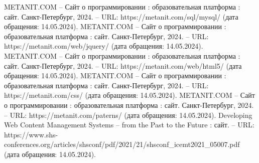 \begin{thebibliography}{20}
		METANIT.COM – Сайт о программировании : образовательная платформа : сайт. Санкт-Петербург, 2024. – URL: https://metanit.com/sql/mysql/ (дата обращения: 14.05.2024).
		METANIT.COM – Сайт о программировании : образовательная платформа : сайт. Санкт-Петербург, 2024. – URL: https://metanit.com/web/jquery/ (дата обращения: 14.05.2024).
	 METANIT.COM – Сайт о программировании : образовательная платформа : сайт. Санкт-Петербург, 2024. – URL: https://metanit.com/web/html5/ (дата обращения: 14.05.2024).
	 METANIT.COM – Сайт о программировании : образовательная платформа : сайт. Санкт-Петербург, 2024. – URL: https://metanit.com/css/ (дата обращения: 14.05.2024).
	 METANIT.COM – Сайт о программировании : образовательная платформа : сайт. Санкт-Петербург, 2024. – URL: https://metanit.com/paterns/ (дата обращения: 14.05.2024).	
	 Developing Web Content Management Systems – from the Past to the Future : сайт. – URL: https://www.shs-conferences.org/articles/shsconf/pdf/2021/21/shsconf\_icemt2021\_05007.pdf (дата обращения: 14.05.2024).
\end{thebibliography}

